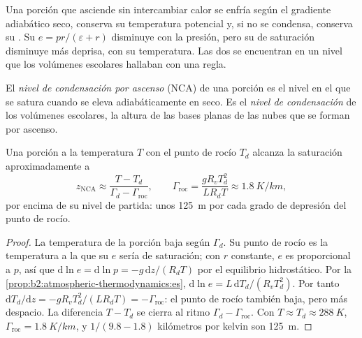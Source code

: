 Una porción que asciende sin intercambiar calor se enfría según el gradiente adiabático seco, conserva su
temperatura potencial y, si no se condensa, conserva su . Su 
$e = pr/(\varepsilon + r)$ disminuye con la presión, pero su  de saturación disminuye
más deprisa, con su temperatura. Las dos se encuentran en un nivel que los volúmenes escolares hallaban con una regla.

\begin{definition}\label{def:b2:atmospheric-thermodynamics:lcl}
El \emph{nivel de condensación por ascenso} (NCA) de una porción es el
nivel en el que se satura cuando se eleva adiabáticamente en seco. Es el
\emph{nivel de condensación} de los volúmenes escolares, la altura de las
bases planas de las nubes que se forman por ascenso.
\end{definition}

\begin{proposition}\label{prop:b2:atmospheric-thermodynamics:lcl}
Una porción a la temperatura $T$ con el punto de rocío $T_d$ alcanza la saturación aproximadamente a
\[
  z_{\text{NCA}} \approx \frac{T - T_d}{\Gamma_d - \Gamma_{\text{roc}}}, \qquad
  \Gamma_{\text{roc}} = \frac{g R_v T_d^2}{L R_d T} \approx \qty{1.8}{K/km},
\]
por encima de su nivel de partida: unos \qty{125}{m} por cada grado de depresión del punto de rocío.
\end{proposition}

\begin{proof}
La temperatura de la porción baja según $\Gamma_d$. Su punto de rocío es la temperatura a la que su
 $e$ sería de saturación; con $r$ constante, $e$ es proporcional a $p$, así que
$\mathrm{d}\ln e = \mathrm{d}\ln p = -g\,\mathrm{d}z/(R_dT)$ por el equilibrio hidrostático. Por la
\cref{prop:b2:atmospheric-thermodynamics:es}, $\mathrm{d}\ln e = L\,\mathrm{d}T_d/(R_vT_d^2)$.
Por tanto $\mathrm{d}T_d/\mathrm{d}z = -gR_vT_d^2/(LR_dT) = -\Gamma_{\text{roc}}$: el punto de rocío también baja,
pero más despacio. La diferencia $T - T_d$ se cierra al ritmo $\Gamma_d - \Gamma_{\text{roc}}$. Con
$T \approx T_d \approx \qty{288}{K}$, $\Gamma_{\text{roc}} = \qty{1.8}{K/km}$, y $1/(9.8 - 1.8)$
kilómetros por kelvin son \qty{125}{m}.
\end{proof}

